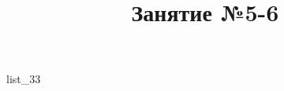 \documentclass[12pt, a4paper]{article}
\begin{document}
	\title{Занятие №5-6}
	{list_33}
\end{document}
